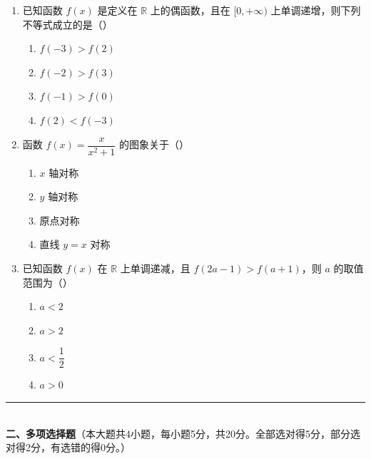 \documentclass[12pt, a4paper]{ctexart}
\begin{document}
\begin{enumerate}
\item 已知函数 $f(x)$ 是定义在 $\mathbb{R}$ 上的偶函数，且在 $[0,+\infty)$ 上单调递增，则下列不等式成立的是（\quad）
  \begin{enumerate}[label=\Alph*., itemsep=0pt]
    \item $f(-3)>f(2)$ \quad \item $f(-2)>f(3)$
    \item $f(-1)>f(0)$ \quad \item $f(2)<f(-3)$
  \end{enumerate}

\item 函数 $f(x)=\dfrac{x}{x^2+1}$ 的图象关于（\quad）
  \begin{enumerate}[label=\Alph*., itemsep=0pt]
    \item $x$ 轴对称 \quad \item $y$ 轴对称
    \item 原点对称 \quad \item 直线 $y=x$ 对称
  \end{enumerate}

\item 已知函数 $f(x)$ 在 $\mathbb{R}$ 上单调递减，且 $f(2a-1)>f(a+1)$，则 $a$ 的取值范围为（\quad）
  \begin{enumerate}[label=\Alph*., itemsep=0pt]
    \item $a<2$ \quad \item $a>2$ \quad \item $a<\dfrac{1}{2}$ \quad \item $a>0$
  \end{enumerate}
\end{enumerate}

\vspace{6pt}

\noindent\rule{\textwidth}{0.4pt}\\[2pt]
{\large\bfseries 二、多项选择题}（本大题共4小题，每小题5分，共20分。全部选对得5分，部分选对得2分，有选错的得0分。）

\vspace{6pt}
\end{document}
